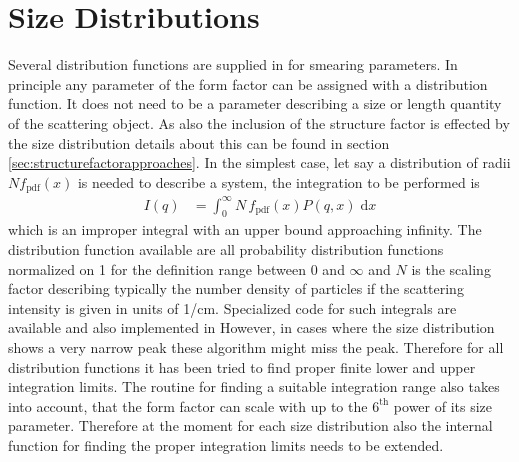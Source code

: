 \chapter{Size Distributions}
\label{sizedistribution}

Several distribution functions are supplied in \SASfit for smearing parameters. In principle any parameter of the form factor can be assigned with a distribution function. It does not need to be a parameter describing a size or length quantity of the scattering object. As also the inclusion of the structure factor is effected by the size distribution details about this can be found in section \ref{sec:structurefactorapproaches}. In the simplest case, let say a distribution of radii $N  f_\mathrm{pdf}(x)$ is needed to describe a system, the integration to be performed is
\begin{align}
I(q) &= \int_0^\infty N\, f_\mathrm{pdf}(x) P(q,x) \; \mathrm{d}x \label{eq:NRintegration}
\end{align}
which is an improper integral with an upper bound approaching infinity. The distribution function available are all probability distribution functions normalized on 1 for the definition range between $0$ and $\infty$ and $N$ is the scaling factor describing typically the number density of particles if the scattering intensity is given in units of 1/cm. Specialized code for such integrals are available and also implemented in {\SASfitd} However, in cases where the size distribution shows a very narrow peak these algorithm might miss the peak. Therefore for all distribution functions it has been tried to find proper finite lower and upper integration limits. The routine for finding a suitable integration range also takes into account, that the form factor can scale with up to the $6^\mathrm{th}$ power of its size parameter. Therefore at the moment for each size distribution also the internal function for finding the proper integration limits needs to be extended.

